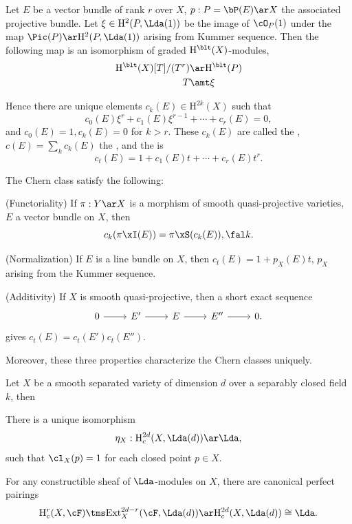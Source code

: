 \documentclass[a4paper, twoside]{article}
\begin{document}
\begin{thm}
    Let $E$ be a vector bundle of rank $r$ over $X$, $p:P=\bP(E)\ar X$ the associated projective bundle. Let $\xi\in \mathrm{H}_{}^{2}(P,\Lda(1))$ be the image of $\cO_{P}(1)$ under the map $\Pic(P)\ar \mathrm{H}_{}^{2}(P,\Lda(1))$ arising from Kummer sequence. Then the following map is an isomorphism of graded $\mathrm{H}_{}^{\blt}(X)$-modules,
    \begin{align*}
      \mathrm{H}_{}^{\blt}(X)[T]/(T^{r})&\ar \mathrm{H}_{}^{\blt}(P) \\
      T&\amt \xi
    \end{align*}

    Hence there are unique elements $c_{k}(E)\in \mathrm{H}_{}^{2k}(X)$ such that
    \[
        c_{0}(E)\xi^{r}+c_{1}(E)\xi^{r-1}+\cdots+c_{r}(E)=0,
    \]
    and $c_{0}(E)=1, c_{k}(E)=0$ for $k>r$. These $c_{k}(E)$ are called the , $c(E)=\sum_{k}c_{k}(E)$ the , and the  is
    \[
        c_{t}(E)=1+c_{1}(E)t+\cdots+c_{r}(E)t^{r}.
    \]
\end{thm}
\begin{thm}
    The Chern class satisfy the following:
    \begin{enr}
        \item (Functoriality) If $\pi:Y\ar X$ is a morphism of smooth quasi-projective varieties, $E$ a vector bundle on $X$, then
        \[
            c_{k}(\pi\xI(E))=\pi\xS(c_{k}(E)), \fal k.
        \]
        \item (Normalization) If $E$ is a line bundle on $X$, then $c_{t}(E)=1+p_{X}(E)t$, $p_{X}$ arising from the Kummer sequence.
        \item (Additivity) If $X$ is smooth quasi-projective, then a short exact sequence
        \[
            \begin{tikzcd}
                0\ar[r] & E'\ar[r] & E\ar[r] & E''\ar[r] & 0.
            \end{tikzcd}
        \]
        gives $c_{t}(E)=c_{t}(E')c_{t}(E'')$.
    \end{enr}
    Moreover, these three properties characterize the Chern classes uniquely.
\end{thm}

\begin{thm}
    Let $X$ be a smooth separated variety of dimension $d$ over a separably closed field $k$, then
    \begin{enr}
        \item There is a unique isomorphism
        \[
            \eta_{X}:\mathrm{H}_{c}^{2d}(X,\Lda(d))\ar \Lda,
        \]
        such that $\cl_{X}(p)=1$ for each closed point $p\in X$.
        \item For any constructible sheaf of $\Lda$-modules on $X$, there are canonical perfect pairings
        \[
            \mathrm{H}_{c}^{r}(X,\cF)\tms \mathrm{Ext}_{X}^{2d-r}(\cF,\Lda(d))\ar \mathrm{H}_{c}^{2d}(X,\Lda(d))\cong\Lda.
        \]
    \end{enr}
\end{thm}
\end{document}
